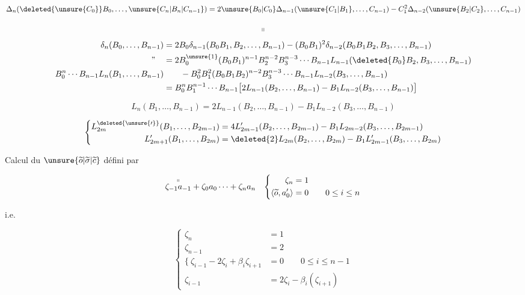 \[
\Delta_n(\deleted{\unsure{C_0}}B_0,\ldots,\unsure{C_n|B_n|C_{n-1}})
=2\unsure{B_0|C_0}\Delta_{n-1}(\unsure{C_1|B_1},\ldots,C_{n-1})-C_1^2\Delta_{n-2}(\unsure{B_2|C_2},\ldots,C_{n-1})
\]

\[
\shortparallel
\]
\[
\begin{aligned}
\delta_n(B_0,\ldots,B_{n-1})&=2B_0\delta_{n-1}(B_0B_1,B_2,\ldots,B_{n-1})-(B_0B_1)^2\delta_{n-2}(B_0B_1B_2,B_3,\ldots,B_{n-1})\\
\text{''}\quad &=2B_0^{\unsure{1}}(B_0B_1)^{n-1}B_2^{n-2}B_3^{n-3}\cdots B_{n-1}L_{n-1}(\deleted{B_0}B_2,B_3,\ldots,B_{n-1})\\
B_0^n\cdots B_{n-1}L_n(B_1,\ldots,B_{n-1})&\qquad-B_0^2B_1^2(B_0 B_1 B_2)^{n-2}B_3^{n-3}\cdots B_{n-1}L_{n-2}(B_3,\ldots,B_{n-1})\\
&=B_0^n B_1^{n-1}\cdots B_{n-1}\bigl[2L_{n-1}(B_2,\ldots,B_{n-1})-B_1L_{n-2}(B_3,\ldots,B_{n-1})\bigr]
\end{aligned}
\]

\[
\boxed{L_n(B_1,\ldots,B_{n-1})=2L_{n-1}(B_2,\ldots,B_{n-1})-B_1 L_{n-2}(B_3,\ldots,B_{n-1})}
\]

\[
\left\{\begin{aligned}
L_{2m}^{\deleted{\unsure{\prime}}}(B_1,\ldots,B_{2m-1})&=4L'_{2m-1}(B_2,\ldots,B_{2m-1})-B_1L_{2m-2}(B_3,\ldots,B_{2m-1})\\
L'_{2m+1}(B_1,\ldots,B_{2m})&=\deleted{2}L_{2m}(B_2,\ldots,B_{2m})-B_1L'_{2m-1}(B_3,\ldots,B_{2m})
\end{aligned}\right.
\]

Calcul du $\unsure{\widetilde{o}|\widetilde{\sigma}|\widetilde{c}}$ défini par

\[
\begin{aligned}
&\overset{\shortparallel}{\zeta_{-1}a_{-1}}+\zeta_0a_0\cdots+\zeta_n a_n
&\left\{\begin{aligned}\zeta_n&=1\\ \langle\widetilde{o},a_{0}^{\prime}\rangle&=0\qquad 0\le i\le n\end{aligned}\right.
\end{aligned}
\]

i.e.

\[
\left\{\begin{aligned}
\zeta_n&=1\\
\zeta_{n-1}&=2\\
\{\ \zeta_{i-1}-2\zeta_i+\beta_i\zeta_{i+1}&=0\qquad 0\le i\le n-1\\
\zeta_{i-1}&=2\zeta_i-\beta_i(\zeta_{i+1})
\end{aligned}\right.
\]

